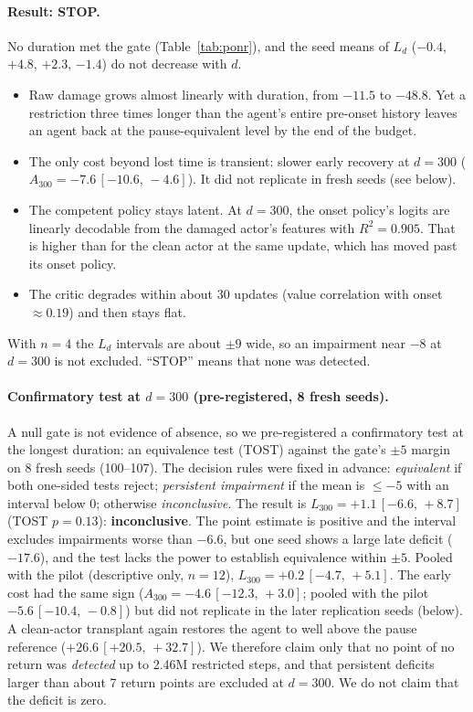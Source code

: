 \documentclass[10pt]{article} %
\newcommand{\ci}[2]{\,[#1,\,#2]}
\begin{document}
\paragraph{Result: STOP.}
No duration met the gate (Table~\ref{tab:ponr}), and the seed means of $L_d$ ($-0.4$, $+4.8$, $+2.3$, $-1.4$) do not decrease with $d$.
\begin{itemize}
\item Raw damage grows almost linearly with duration, from $-11.5$ to $-48.8$. Yet a restriction three times longer than the agent's entire pre-onset history leaves an agent back at the pause-equivalent level by the end of the budget.
\item The only cost beyond lost time is transient: slower early recovery at $d=300$ ($A_{300}=-7.6\ci{-10.6}{-4.6}$). It did not replicate in fresh seeds (see below).
\item The competent policy stays latent. At $d=300$, the onset policy's logits are linearly decodable from the damaged actor's features with $R^2=0.905$. That is higher than for the clean actor at the same update, which has moved past its onset policy.
\item The critic degrades within about 30 updates (value correlation with onset $\approx0.19$) and then stays flat.
\end{itemize}
With $n=4$ the $L_d$ intervals are about $\pm9$ wide, so an impairment near $-8$ at $d=300$ is not excluded. ``STOP'' means that none was detected.

\paragraph{Confirmatory test at $d=300$ (pre-registered, 8 fresh seeds).}
A null gate is not evidence of absence, so we pre-registered a confirmatory test at the longest duration: an equivalence test (TOST) against the gate's $\pm5$ margin on 8 fresh seeds (100--107). The decision rules were fixed in advance: \emph{equivalent} if both one-sided tests reject; \emph{persistent impairment} if the mean is $\le-5$ with an interval below 0; otherwise \emph{inconclusive}. The result is $L_{300}=+1.1\ci{-6.6}{+8.7}$ (TOST $p=0.13$): \textbf{inconclusive}. The point estimate is positive and the interval excludes impairments worse than $-6.6$, but one seed shows a large late deficit ($-17.6$), and the test lacks the power to establish equivalence within $\pm5$. Pooled with the pilot (descriptive only, $n=12$), $L_{300}=+0.2\ci{-4.7}{+5.1}$. The early cost had the same sign ($A_{300}=-4.6\ci{-12.3}{+3.0}$; pooled with the pilot $-5.6\ci{-10.4}{-0.8}$) but did not replicate in the later replication seeds (below). A clean-actor transplant again restores the agent to well above the pause reference ($+26.6\ci{+20.5}{+32.7}$).
We therefore claim only that no point of no return was \emph{detected} up to 2.46M restricted steps, and that persistent deficits larger than about 7 return points are excluded at $d=300$. We do not claim that the deficit is zero.
\end{document}
